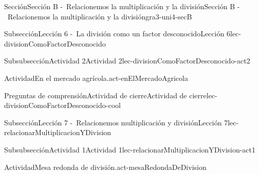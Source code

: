\begin{sectionptx}{Sección}{Sección B -~Relacionemos la multiplicación y la división}{}{Sección B -~Relacionemos la multiplicación y la división}{}{}{gra3-uni4-secB}
\begin{subsectionptx}{Subsección}{Lección 6 -~La división como un factor desconocido}{}{Lección 6}{}{}{lec-divisionComoFactorDesconocido}
\begin{subsubsectionptx}{Subsubsección}{Actividad 2}{}{Actividad 2}{}{}{lec-divisionComoFactorDesconocido-act2}
\begin{activity}{Actividad}{En el mercado agrícola.}{act-enElMercadoAgricola}
\begin{image}{0}{1}{0}{}
\end{image}%
\end{activity}%
\end{subsubsectionptx}
%
%
\typeout{************************************************}
\typeout{************************************************}
%
\begin{reading-questions-subsubsection}{Preguntas de comprensión}{Actividad de cierre}{}{Actividad de cierre}{}{}{lec-divisionComoFactorDesconocido-cool}
%
\end{reading-questions-subsubsection}
\end{subsectionptx}
%
%
\typeout{************************************************}
\typeout{************************************************}
%
\begin{subsectionptx}{Subsección}{Lección 7 -~Relacionemos multiplicación y división}{}{Lección 7}{}{}{lec-relacionarMultiplicacionYDivision}
%
%
\typeout{************************************************}
\typeout{************************************************}
%
\begin{subsubsectionptx}{Subsubsección}{Actividad 1}{}{Actividad 1}{}{}{lec-relacionarMultiplicacionYDivision-act1}
\begin{activity}{Actividad}{Mesa redonda de división.}{act-mesaRedondaDeDivision}%

\end{activity}
\end{subsubsectionptx}
\end{subsectionptx}
\end{sectionptx}
